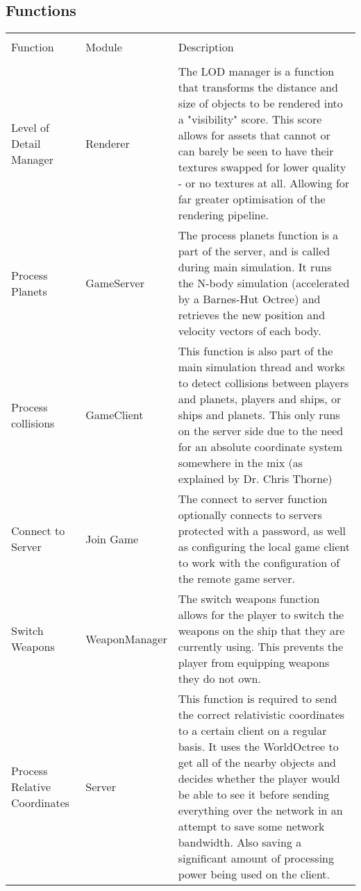 \documentclass[12pt, DIV=calc]{scrartcl}
\begin{document}
\subsection{Functions}
\begin{xltabular}[c]{\textwidth}{| X | X | X |}
    \hline \\
Function & Module & Description \\
    \hline \hline \\
Level of Detail Manager & Renderer & The LOD manager is a function that transforms the distance and size of objects to be rendered into a "visibility" score. This score allows for assets that cannot or can barely be seen to have their textures swapped for lower quality - or no textures at all. Allowing for far greater optimisation of the rendering pipeline.  \\ \hline
Process Planets & GameServer & The process planets function is a part of the server, and is called during main simulation. It runs the N-body simulation (accelerated by a Barnes-Hut Octree) and retrieves the new position and velocity vectors of each body.  \\ \hline
Process collisions & GameClient & This function is also part of the main simulation thread and works to detect collisions between players and planets, players and ships, or ships and planets. This only runs on the server side due to the need for an absolute coordinate system somewhere in the mix (as explained by Dr. Chris Thorne)  \\ \hline
Connect to Server & Join Game & The connect to server function optionally connects to servers protected with a password, as well as configuring the local game client to work with the configuration of the remote game server.  \\ \hline
Switch Weapons & WeaponManager & The switch weapons function allows for the player to switch the weapons on the ship that they are currently using. This prevents the player from equipping weapons they do not own.   \\ \hline
Process Relative Coordinates & Server & This function is required to send the correct relativistic coordinates to a certain client on a regular basis. It uses the WorldOctree to get all of the nearby objects and decides whether the player would be able to see it before sending everything over the network in an attempt to save some network bandwidth. Also saving a significant amount of processing power being used on the client.  \\ \hline
\end{xltabular}
\end{document}
